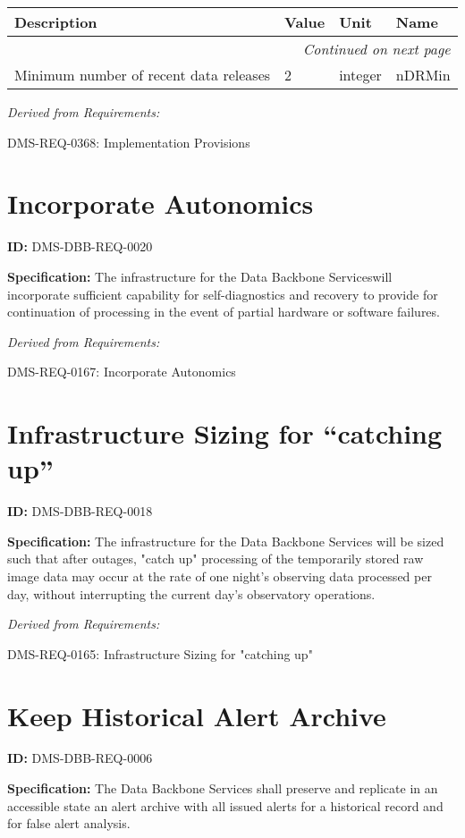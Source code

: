 \documentclass[SE,toc,lsstdraft]{lsstdoc}
\makeatletter
\newcommand{\paramname}[1]{\hspace{0pt}#1}
\newcommand{\unitname}[1]{\hspace{0pt}#1}
\newenvironment{parameters}[0]{%
\setlength\LTleft{0pt}
\setlength\LTright{\fill}
\begin{small}
\begin{longtable}[]{|p{0.49\textwidth}|l|p{0.6in}|p{1.70in}@{}|}

\hline \textbf{Description} & \textbf{Value} & \textbf{Unit} & \textbf{Name} \\ \hline
\endhead

\hline \multicolumn{4}{r}{\emph{Continued on next page}} \\
\endfoot

\hline\hline
\endlastfoot
}{%
\hline
\end{longtable}
\end{small}
}
\makeatother
\begin{document}
\begin{parameters}
Minimum number of recent data releases
&
2
&
\unitname{%
integer
}
&
\paramname{%
nDRMin
} \\\hline
\end{parameters}

\emph{Derived from Requirements:}

DMS-REQ-0368:
Implementation Provisions \newline

\section{Incorporate Autonomics}

\label{DMS-DBB-REQ-0020}
\textbf{ID:} DMS-DBB-REQ-0020

\textbf{Specification:}
The infrastructure for the Data Backbone Serviceswill incorporate sufficient capability for self-diagnostics and recovery to provide for continuation of processing in the event of partial hardware or software failures.

\emph{Derived from Requirements:}

DMS-REQ-0167:
Incorporate Autonomics \newline

\section{Infrastructure Sizing for “catching up”}

\label{DMS-DBB-REQ-0018}
\textbf{ID:} DMS-DBB-REQ-0018

\textbf{Specification:}
The infrastructure for the Data Backbone Services will be sized such that after outages, "catch up" processing of the temporarily stored raw image data may occur at the rate of one night’s observing data processed per day, without interrupting the current day's observatory operations.

\emph{Derived from Requirements:}

DMS-REQ-0165:
Infrastructure Sizing for "catching up" \newline

\section{Keep Historical Alert Archive}

\label{DMS-DBB-REQ-0006}
\textbf{ID:} DMS-DBB-REQ-0006

\textbf{Specification:}
The Data Backbone Services shall preserve and replicate in an accessible state an alert archive with all issued alerts for a historical record and for false alert analysis.
\end{document}
